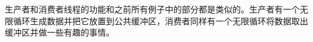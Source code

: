 	生产者和消费者线程的功能和之前所有例子中的部分都是类似的。生产者有一个无限循环生成数据并把它放置到公共缓冲区，消费者同样有一个无限循环将数据取出缓冲区并做一些有趣的事情。
	
	
	
	
	
	
	
	
	
	
	
	
		
	
	
	
	
	
	
	
		
	
	
	
	
	
	
	
	
	
	
	
	
	
	
	
	
	
	
	
	
	
	
	
	
	
	
	
	
	
	
	
	
	
	
	
	
	
	
	
	
	

	
	
	
	
	
	
	
	
	
	
	
	
	
	
	
	
	
	
	
	
	


